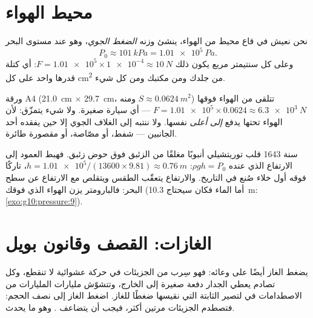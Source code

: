 \section{محيط الهواء}

\begin{definition}\label{def:g10:pressure:atmospheric}
نحن نعيش في قاع محيط من الهواء، ينشئ وزنه
\emph{الضغط الجوي}، وهو عند مستوى البحر
\[
P_0 \approx \qty{101}{kPa} = \qty{1.01e5}{Pa}.
\]
وعلى كل سنتيمتر مربع يكون ذلك $F = \num{1.01e5} \times \num{1e-4}
\approx \qty{10}{N}$: أي  كتلة قدرها  واحد على كل
\unit{cm^2} من جلدك ومن مكتبك ومن كل شيء.
\end{definition}

\begin{example}\label{ex:g10:pressure:sheet}
ورقة A4 (\qty{21.0}{cm} $\times$ \qty{29.7}{cm}، ومنه
$S \approx \qty{0.0624}{m^2}$) تتلقى من الهواء فوقها
$F = \num{1.01e5} \times 0.0624 \approx \qty{6.3e3}{N}$ --- أي 
سيارة صغيرة. ولا شيء يتمزّق: لأن الهواء تحتها يدفع
\emph{إلى أعلى}  نفسها. ولا ننتبه إلى الغلاف الجوي إلا حين يفقده أحد
الجانبين ---  شفط، أو مصّاصة، أو مقصورة طائرة.
\end{example}

\begin{remark}\label{rem:g10:pressure:torricelli}
سنة 1643 قلب توريتشيلي أنبوبًا مغلقًا من الزئبق فوق حوض
زئبق. فهبط العمود إلى الارتفاع الذي عنده $\rho g h = P_0$:
$h = \num{1.01e5}/(13600 \times 9.81) \approx \qty{0.76}{m}$، تاركًا
فوقه أول خلاء صُنع في التاريخ. والارتفاع يتعقّب الطقس
ويتقلص مع الارتفاع عن سطح البحر: فالبارومتر يزن الهواء الذي فوقك (أما الماء
فكان سيحتاج \qty{10.3}{m}: \cref{exo:g10:pressure:9}).
\end{remark}

\section{الغازات: القصف وقانون بويل}

يضغط الغاز أيضًا على وعائه: فهو سِرب من الجزيئات في
حركة عشوائية لا تنقطع، وكل تصادم يعطي الجدار دفعة صغيرة إلى الخارج،
وتتشوّش مليارات المليارات من الاصطدامات في  لتصير 
الثابتة التي نقيسها ضغطًا للغاز. اضغط الغاز إلى نصف
الحجم: فتصطدم الجزيئات مرتين أكثر، فيجب أن يتضاعف .
وهو ما يحدث.

